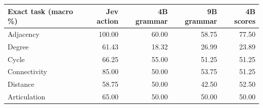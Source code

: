 \begin{tabular}{lrrrr}
\toprule
Exact task (macro \%) & Jev action & 4B grammar & 9B grammar & 4B scores \\
\midrule
Adjacency & 100.00 & 60.00 & 58.75 & 77.50 \\
Degree & 61.43 & 18.32 & 26.99 & 23.89 \\
Cycle & 66.25 & 55.00 & 51.25 & 51.25 \\
Connectivity & 85.00 & 50.00 & 53.75 & 51.25 \\
Distance & 58.75 & 50.00 & 42.50 & 52.50 \\
Articulation & 65.00 & 50.00 & 50.00 & 50.00 \\
\bottomrule
\end{tabular}

